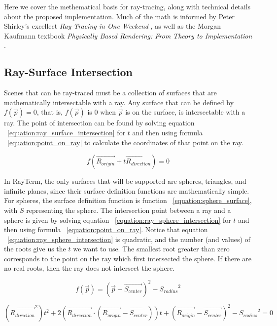 \documentclass[11pt]{article}
\newcommand{\name}{{\sc RayTerm}}
\newcommand{\rayorg}{\vec{R_{origin}}}
\newcommand{\raydir}{\vec{R_{direction}}}
\begin{document}
Here we cover the methematical basis for ray-tracing, along with technical details about the proposed implementation.
Much of the math is informed by Peter Shirley's excellect {\it Ray Tracing in One Weekend} \cite{shirley2016ray}, as well as the Morgan Kaufmann textbook {\it Physically Based Rendering: From Theory to Implementation} \cite{pharr2016physically}.


\subsection{Ray-Surface Intersection}

Scenes that can be ray-traced must be a collection of surfaces that are mathematically intersectable with a ray.
Any surface that can be defined by $f(\vec{p}) = 0$, that is, $f(\vec{p})$ is $0$ when $\vec{p}$ is on the surface, is intersectable with a ray.
The point of intersection can be found by solving equation ~\ref{equation:ray_surface_intersection} for $t$ and then using formula ~\ref{equation:point_on_ray} to calculate the coordinates of that point on the ray.

\begin{equation}
  \label{equation:ray_surface_intersection}
  f(\rayorg + t\raydir) = 0
\end{equation}

In \name, the only surfaces that will be supported are spheres, triangles, and infinite planes, since their surface definition functions are mathematically simple.
For spheres, the surface definition function is function ~\ref{equation:sphere_surface}, with $S$ representing the sphere.
The intersection point between a ray and a sphere is given by solving equation ~\ref{equation:ray_sphere_intersection} for $t$ and then using formula ~\ref{equation:point_on_ray}.
Notice that equation ~\ref{equation:ray_sphere_intersection} is quadratic, and the number (and values) of the roots give us the $t$ we want to use. The smallest root greater than zero corresponds to the point on the ray which first intersected the sphere. If there are no real roots, then the ray does not intersect the sphere.

\begin{equation}
  \label{equation:sphere_surface}
  f(\vec{p}) = (\vec{p} - \vec{S_{center}})^2 - {S_{radius}}^2
\end{equation}

\begin{equation}
  \label{equation:ray_sphere_intersection}
  (\raydir^2)t^2 + 2(\raydir \cdot (\rayorg - \vec{S_{center}}))t + (\rayorg - \vec{S_{center}})^2 - {S_{radius}}^2 = 0
\end{equation}
\end{document}
